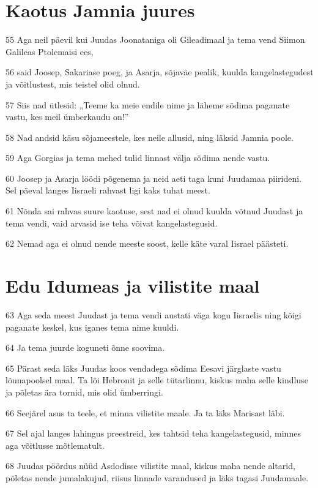 \section*{Kaotus Jamnia juures}

\par 55 Aga neil päevil kui Juudas Joonataniga oli Gileadimaal ja tema vend Siimon Galileas Ptolemaisi ees,
\par 56 said Joosep, Sakariase poeg, ja Asarja, sõjaväe pealik, kuulda kangelastegudest ja võitlustest, mis teistel olid olnud.
\par 57 Siis nad ütlesid: „Teeme ka meie endile nime ja läheme sõdima paganate vastu, kes meil ümberkaudu on!”
\par 58 Nad andsid käsu sõjameestele, kes neile allusid, ning läksid Jamnia poole.
\par 59 Aga Gorgias ja tema mehed tulid linnast välja sõdima nende vastu.
\par 60 Joosep ja Asarja löödi põgenema ja neid aeti taga kuni Juudamaa piirideni. Sel päeval langes Iisraeli rahvast ligi kaks tuhat meest.
\par 61 Nõnda sai rahvas suure kaotuse, sest nad ei olnud kuulda võtnud Juudast ja tema vendi, vaid arvasid ise teha võivat kangelastegusid.
\par 62 Nemad aga ei olnud nende meeste soost, kelle käte varal Iisrael päästeti. 

\section*{Edu Idumeas ja vilistite maal}

\par 63 Aga seda meest Juudast ja tema vendi austati väga kogu Iisraelis ning kõigi paganate keskel, kus iganes tema nime kuuldi.
\par 64 Ja tema juurde koguneti õnne soovima.
\par 65 Pärast seda läks Juudas koos vendadega sõdima Eesavi järglaste vastu lõunapoolsel maal. Ta lõi Hebronit ja selle tütarlinnu, kiskus maha selle kindluse ja põletas ära tornid, mis olid ümberringi.
\par 66 Seejärel asus ta teele, et minna vilistite maale. Ja ta läks Marisast läbi.
\par 67 Sel ajal langes lahingus preestreid, kes tahtsid teha kangelastegusid, minnes aga võitlusse mõtlematult.
\par 68 Juudas pöördus nüüd Asdodisse vilistite maal, kiskus maha nende altarid, põletas nende jumalakujud, riisus linnade varandused ja läks tagasi Juudamaale.

